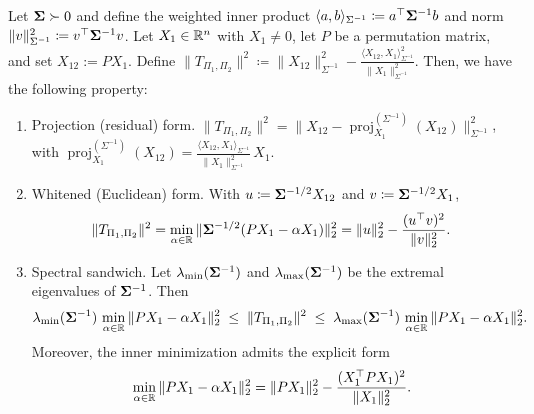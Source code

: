 \documentclass[numsec,webpdf,modern,medium,namedate]{oup-authoring-template}
\theoremstyle{thmstyleone}%
\theoremstyle{thmstyletwo}%
\theoremstyle{thmstylethree}%
\begin{document}
\begin{lemma}\label{lem:T-bound}
Let $\boldsymbol{\Sigma} \succ 0$ and define the weighted inner product $\langle a,b\rangle_{\Sigma^{-1}} \coloneq a^\top \boldsymbol{\Sigma}^{-1} b$  and norm $\|v\|_{\Sigma^{-1}}^2 \coloneqq v^\top \boldsymbol{\Sigma}^{-1} v$. Let $X_1\in\mathbb{R}^n$ with $X_1\neq 0$, let $P$ be a permutation matrix, and set $X_{12}:=PX_1$.
Define
$\|T_{\Pi_1,\Pi_2}\|^2
\coloneqq \|X_{12}\|_{\Sigma^{-1}}^2
   - \frac{\langle X_{12},X_1\rangle_{\Sigma^{-1}}^2}{\|X_1\|_{\Sigma^{-1}}^2}$. Then, we have the following property:
\begin{enumerate}
\item[(i)] {Projection (residual) form.} $\|T_{\Pi_1,\Pi_2}\|^2
= \big\|X_{12}-\operatorname{proj}^{(\Sigma^{-1})}_{X_{1}}\!\left(X_{12}\right)\big\|_{\Sigma^{-1}}^2$,
with
$\operatorname{proj}^{(\Sigma^{-1})}_{X_{1}}\!\left(X_{12}\right)
= \frac{\langle X_{12},X_{1}\rangle_{\Sigma^{-1}}}{\|X_{1}\|_{\Sigma^{-1}}^2}\,X_{1}.$
\item[(ii)] {Whitened (Euclidean) form.} With $u\coloneqq\boldsymbol{\Sigma}^{-1/2}X_{12}$ and $v\coloneqq\boldsymbol{\Sigma}^{-1/2}X_{1}$,
$$
\|T_{\Pi_1,\Pi_2}\|^2
= \min_{\alpha\in\mathbb{R}}\|\boldsymbol{\Sigma}^{-1/2}(PX_1-\alpha X_1)\|_2^2
= \|u\|_2^2 - \frac{(u^\top v)^2}{\|v\|_2^2}.
$$
\item[(iii)] {Spectral sandwich.}  
Let $\lambda_{\min}(\boldsymbol{\Sigma}^{-1})$ and $\lambda_{\max}(\boldsymbol{\Sigma}^{-1})$ be the extremal eigenvalues of $\boldsymbol{\Sigma}^{-1}$. Then
$$
\lambda_{\min}(\boldsymbol{\Sigma}^{-1})\,
\min_{\alpha\in\mathbb{R}}\|PX_1-\alpha X_1\|_2^2
\;\le\;
\|T_{\Pi_1,\Pi_2}\|^2
\;\le\;
\lambda_{\max}(\boldsymbol{\Sigma}^{-1})\,
\min_{\alpha\in\mathbb{R}}\|PX_1-\alpha X_1\|_2^2.
$$
Moreover, the inner minimization admits the explicit form
$$
\min_{\alpha\in\mathbb{R}}\|PX_1-\alpha X_1\|_2^2
= \|PX_1\|_2^2 - \frac{(X_1^\top P X_1)^2}{\|X_1\|_2^2}.
$$
\end{enumerate}
\end{lemma}
\end{document}

